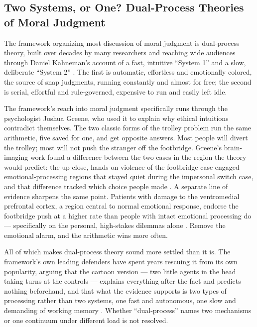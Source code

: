 \subsection{Two Systems, or One? Dual-Process Theories of Moral Judgment}
\label{sec:5.3.1}
The framework organizing most discussion of moral judgment is dual-process theory, built over decades by many researchers and reaching wide audiences through Daniel Kahneman's account of a fast, intuitive “System 1” and a slow, deliberate “System 2” \autocite{kahneman2011thinking,evans2013dual}. The first is automatic, effortless and emotionally colored, the source of snap judgments, running constantly and almost for free; the second is serial, effortful and rule-governed, expensive to run and easily left idle.

The framework's reach into moral judgment specifically runs through the psychologist Joshua Greene, who used it to explain why ethical intuitions contradict themselves. The two classic forms of the trolley problem run the same arithmetic, five saved for one, and get opposite answers. Most people will divert the trolley; most will not push the stranger off the footbridge. Greene's brain-imaging work found a difference between the two cases in the region the theory would predict: the up-close, hands-on violence of the footbridge case engaged emotional-processing regions that stayed quiet during the impersonal switch case, and that difference tracked which choice people made \autocite{greene2001fmri}. A separate line of evidence sharpens the same point. Patients with damage to the ventromedial prefrontal cortex, a region central to normal emotional response, endorse the footbridge push at a higher rate than people with intact emotional processing do — specifically on the personal, high-stakes dilemmas alone \autocite{koenigs2007damage}. Remove the emotional alarm, and the arithmetic wins more often.

All of which makes dual-process theory sound more settled than it is. The framework's own leading defenders have spent years rescuing it from its own popularity, arguing that the cartoon version — two little agents in the head taking turns at the controls — explains everything after the fact and predicts nothing beforehand, and that what the evidence supports is two types of processing rather than two systems, one fast and autonomous, one slow and demanding of working memory \autocite{evans2013dual}. Whether “dual-process” names two mechanisms or one continuum under different load is not resolved.

